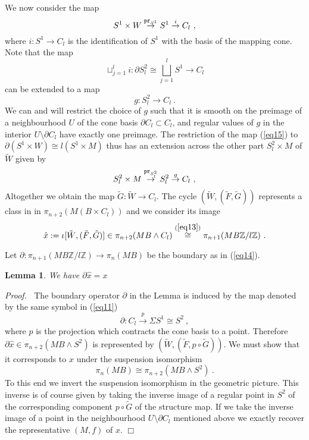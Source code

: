 \documentclass[12pt]{article}
\newtheorem{lem}[theorem]{Lemma}
\def\hB{\hspace*{\fill}$\Box$ \newline\noindent}
\newcommand{\proof}{{\it Proof.$\:\:\:\:$}}
\newcommand{\Z}{{\mathbb{Z}}}
\newcommand{\pr}{{\tt pr}}
\begin{document}
We now consider the map
\begin{equation}\label{eq15}S^{1}\times W\stackrel{\pr_{S^{1}}}{\to} S^{1}\stackrel{i}{\to} C_{l}\ ,\end{equation} 
where $i:S^{1}\to C_{l}$ is the identification of $S^{1}$ with the basis of the mapping cone.
Note that the map
$$\sqcup_{j=1}^{l}i :\partial S^{2}_{l}\cong \bigsqcup_{j=1}^{l }S^{1}\to C_{l}$$ can be extended
to a map 
\begin{equation}\label{eq51}g:S^{2}_{l}\to C_{l}\ .\end{equation} 
We can and will restrict the choice of  $g$ such that it is smooth on the preimage of a neighbourhood $U$ of  the cone basis  $\partial C_{l}\subset C_{l}$, and regular values of $g$ in the interior $U\setminus \partial C_{l}$ have exactly one preimage. 
The restriction of the map (\ref{eq15}) to $\partial (S^{1}\times W)\cong l(S^{1}\times M)$ thus  has an extension across the other part
$S^{2}_{l}\times M$ of $\tilde W$ given by 
$$S^{2}_{l}\times M\stackrel{\pr_{S^{2}_{l}}}{\to} S^{2}_{l}\stackrel{g}{\to} C_{l}\ ,$$
 Altogether we obtain the map
$\tilde  G :\tilde W\to C_{l}$. The cycle $(\tilde W,(\tilde F,\tilde G))$ represents a class in in 
$\pi_{n+2}(M(B\times C_{l}))$ and we consider its image
$$\hat x:= \iota[\tilde W,(\tilde F,\tilde G)]\in \pi_{n+2}(MB\wedge C_{l})\stackrel{(\ref{eq13})}{\cong} \pi_{n+1}(MB\Z/l\Z)\ .$$






Let $\partial:\pi_{n+1}(MB\Z/l\Z)\to \pi_{n}(MB)$
be  the boundary as in (\ref{eq14}). 
\begin{lem}\label{sec25}
We have $\partial \hat x=x$
\end{lem}
\proof  The  boundary operator $\partial$ in the Lemma is induced by 
the map denoted by the same symbol in (\ref{eq11})
$$\partial:C_{l}\stackrel{p}{\to} \Sigma S^{1}\cong S^{2}\ ,$$
where $p$ is the projection which contracts the cone basis to a point.
Therefore
$\partial \hat x\in \pi_{n+2}(MB\wedge S^{2})$ is represented by 
$(\tilde W,(\tilde F,p \circ \tilde G))$. We must show that it corresponds to
$x$ under the suspension isomorphism
$$\pi_{n}(MB)\cong \pi_{n+2}(MB\wedge S^{2})\ .$$
To this end we invert the suspension isomorphism in the geometric picture.
This inverse is of course given by taking the inverse image of  a regular point in $S^{2}$ of the corresponding component $p\circ \tilde G$ of the structure map. If we take the inverse image of
a point in the neighbourhood $U\setminus \partial C_{l}$ mentioned above we exactly recover the representative $(M,f)$ of $x$. \hB 
\end{document}
